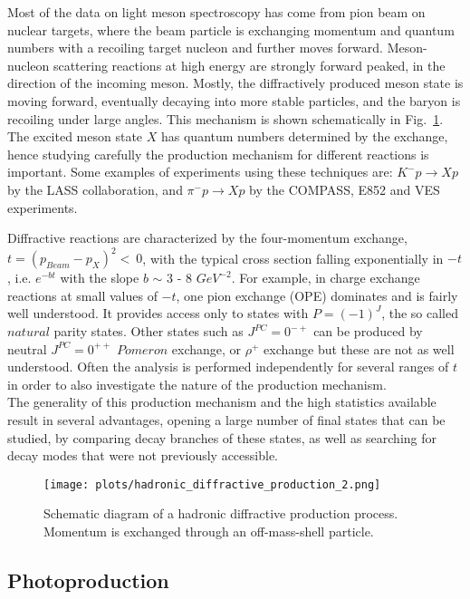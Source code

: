  Most of the data on light meson spectroscopy has come from pion beam on nuclear targets, where the beam particle is exchanging momentum and quantum numbers with a recoiling target nucleon and further moves forward. Meson-nucleon scattering reactions at high energy are strongly forward peaked, in the direction of the incoming meson. Mostly, the diffractively produced meson state is moving forward, eventually decaying into more stable particles, and the baryon is recoiling under large angles. This mechanism is shown schematically in Fig.~\ref{fig.1.3.2}. The excited meson state $X$ has quantum numbers determined by the exchange, hence studying carefully the production mechanism for different reactions is important. Some examples of experiments using these techniques are: $K^{-}p \rightarrow Xp$ by the LASS collaboration, and $\pi^{-}p \rightarrow Xp$ by the COMPASS, E852 and VES experiments.
 ~\par Diffractive reactions are characterized by the four-momentum exchange, $t = (p_{Beam}-p_{X})^{2}<~0$, with the typical cross section falling exponentially in $-t$, i.e. $e^{-bt}$ with the slope $b$ $\sim$ 3 - 8 $GeV^{-2}$. For example, in charge exchange reactions at small values of $-t$, one pion exchange (OPE) dominates and is fairly well understood. It provides access only to states with $P = (-1)^{J}$, the so called $natural$ parity states. Other states such as $J^{PC} = 0^{-+}$ can be produced by neutral $J^{PC} = 0^{++}$ $Pomeron$ exchange, or $\rho^{+}$ exchange but these are not as well understood. Often the analysis is performed independently for several ranges of $t$ in order to also investigate the nature of the production mechanism.\\
The generality of this production mechanism and the high statistics available result in several advantages, opening a large number of final states that can be studied, by comparing decay branches of these states, as well as searching for decay modes that were not previously accessible.

\begin{figure}[H]
    \centering
        \texttt{[image: plots/hadronic\_diffractive\_production\_2.png]}
        \vspace*{7mm}
        \caption{Schematic diagram of a hadronic diffractive production process. Momentum is exchanged through an off-mass-shell particle.}
        \label{fig.1.3.2}
\end{figure}

 \subsection{Photoproduction}

